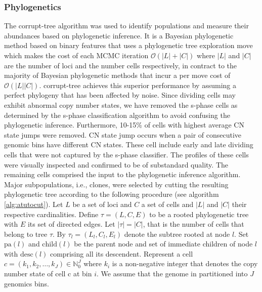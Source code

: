 \documentclass{article}
\begin{document}
\subsubsection{Phylogenetics}
The corrupt-tree algorithm \cite{corrupttree} was used to identify populations and measure their abundances based on phylogenetic inference. 
It is a Bayesian phylogenetic method based on binary features that uses a phylogenetic tree exploration move which makes the cost of each MCMC iteration $\mathcal{O}({\lvert}L{\rvert} + {\lvert}C{\rvert})$  where ${\lvert}L{\rvert}$ and ${\lvert}C{\rvert}$ are the number of loci and the number cells respectively, in contract to the majority of Bayesian phylogenetic methods that incur a per move cost of $\mathcal{O}({\lvert}L{\rvert} {\lvert}C{\rvert})$.
corrupt-tree achieves this superior performance by assuming a perfect phylogeny that has been affected by noise. 
Since dividing cells may exhibit abnormal copy number states, we have removed the s-phase cells as determined by the s-phase classification algorithm to avoid confusing the phylogenetic inference.
Furthermore, 10-15\% of cells with highest average CN state jumps were removed. 
CN state jump occurs when a pair of consecutive genomic bins have different CN states.
These cell include early and late dividing cells that were not captured by the s-phase classifier. 
The profiles of these cells were visually inspected and confirmed to be of substandard quality. 
The remaining cells comprised the input to the phylogenetic inference algorithm.
Major subpopulations, i.e., clones, were selected by cutting the resulting phylogenetic tree according to the following procedure (see algorithm \ref{alg:atutocut}).
Let $L$ be a set of loci and $C$ a set of cells and ${\lvert}L{\rvert}$ and ${\lvert}C{\rvert}$ their respective cardinalities. 
Define $\tau = (L, C, E)$ to be a rooted phylogenetic tree with $E$ its set of directed edges.
Let ${\lvert}\tau{\rvert} = {\lvert}C{\rvert}$, that is the number of cells that belong to tree $\tau$.
By $\tau_{l} = (L_l, C_l, E_l)$ denote the subtree rooted at node $l$.
Set $\text{pa}(l)$ and $\text{child}(l)$ be the parent node and set of immediate children of node $l$ with $\text{desc}(l)$ comprising all its descendent.
Represent a cell $c = (k_1, k_2, \dots, k_J) \in \mathbb{N}_{0}^J$ where $k_i$ is a non-negative integer that denotes the copy number state of cell c at bin $i$.
We assume that the genome in partitioned into $J$ genomics bins.
\end{document}
